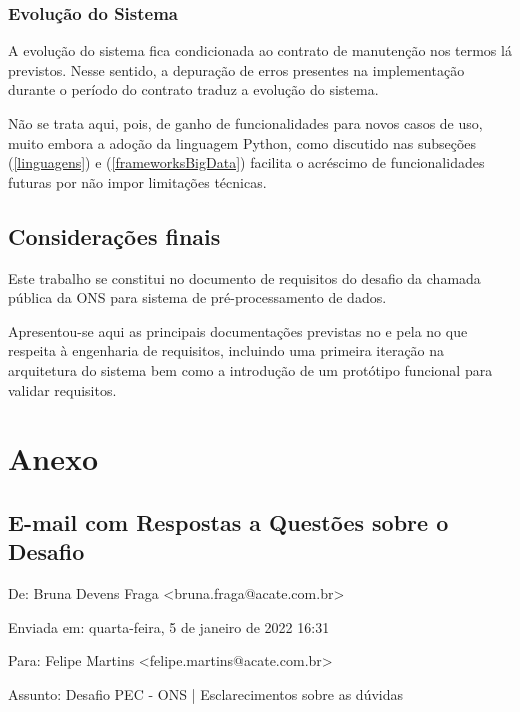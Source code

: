\documentclass[a4paper, 12pt]{report}
\begin{document}
\section{Evolução do Sistema}
\begin{doublespace}
A evolução do sistema fica condicionada ao contrato de manutenção nos termos lá previstos.  Nesse sentido, a depuração de erros presentes na implementação durante o período do contrato traduz a evolução do sistema.

Não se trata aqui, pois, de ganho de funcionalidades para novos casos de uso, muito embora a adoção da linguagem Python, como discutido nas subseções (\ref{linguagens}) e (\ref{frameworksBigData}) facilita o acréscimo de funcionalidades futuras por não impor limitações técnicas.


\end{doublespace}

\chapter{Considerações finais}

\begin{doublespace}
Este trabalho se constitui no documento de requisitos do desafio da chamada pública da ONS para sistema de pré-processamento de dados.

Apresentou-se aqui as principais documentações previstas no \citet{swebok2014} e pela \cite{IeeeSRS720574} no que respeita à engenharia de requisitos, incluindo uma primeira iteração na arquitetura do sistema bem como a introdução de um protótipo funcional para validar requisitos.
\end{doublespace}

\part*{Anexo}

\chapter*{E-mail com Respostas a Questões sobre o Desafio}

De: Bruna Devens Fraga <bruna.fraga@acate.com.br>

Enviada em: quarta-feira, 5 de janeiro de 2022 16:31

Para: Felipe Martins <felipe.martins@acate.com.br>

Assunto: Desafio PEC - ONS | Esclarecimentos sobre as dúvidas
\end{document}

